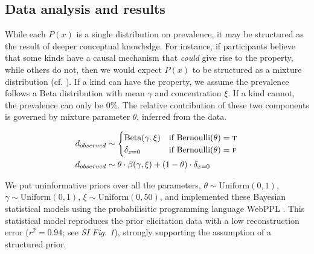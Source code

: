 \documentclass[10pt,letterpaper]{article}
\begin{document}
 \subsection*{Data analysis and results}
 
While each $P(x)$ is a single distribution on prevalence, it may be structured as the result of deeper conceptual knowledge. 
For instance, if participants believe that some kinds have a causal mechanism that \emph{could} give rise to the property, while others do not, then we would expect $P(x)$ to be structured as a mixture distribution (cf. \cite{Griffiths2005}).
If a kind can have the property, we assume the prevalence follows a Beta distribution with mean $\gamma$ and concentration $\xi$. 
If a kind cannot, the prevalence can only be 0\%.
The relative contribution of these two components is governed by mixture parameter $\theta$, inferred from the data.

\begin{align*}
	d_{observed} & \sim \begin{cases}
				 \text{Beta}(\gamma, \xi) & \mbox{if } \text{Bernoulli}(\theta) = \textsc{t}  \\
				 \delta_{x=0} & \mbox{if }\text{Bernoulli}(\theta) = \textsc{f} \\
				\end{cases} \\
	 d_{observed} &  \sim \theta \cdot \beta(\gamma,\xi)+ (1 - \theta) \cdot \delta_{x=0} 
\end{align*}

We put uninformative priors over all the parameters, $\theta \sim \text{Uniform}(0,1)$, 
$\gamma \sim \text{Uniform}(0,1)$, $\xi \sim \text{Uniform}(0, 50)$, and implemented these Bayesian statistical models using the probabilisitic programming language WebPPL \cite{dippl}. This statistical model reproduces the prior elicitation data with a low reconstruction error ($r^2 = 0.94$; see {\it SI Fig. 1}), strongly supporting the assumption of a structured prior. 
\end{document}
